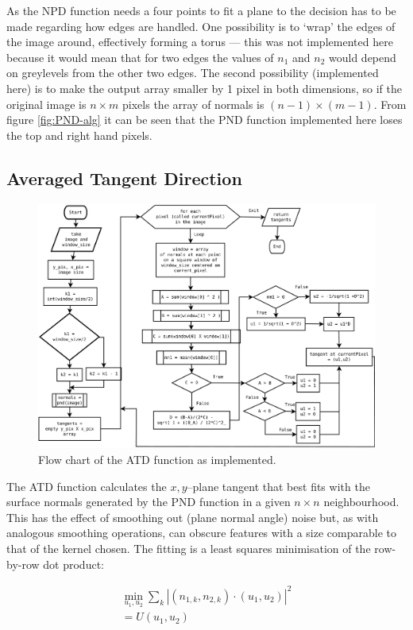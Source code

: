 \documentclass[11pt,a4paper]{article}
\begin{document}
\begin{multicols}{2}
		As the NPD function needs a four points to fit a plane to the decision has to be made regarding how edges are handled. One possibility is to `wrap' the edges of the image around, effectively forming a torus --- this was not implemented here because it would mean that for two edges the values of $n_1$ and $n_2$ would depend on greylevels from the other two edges. The second possibility (implemented here) is to make the output array smaller by 1 pixel in both dimensions, so if the original image is $n \times m$ pixels the array of normals is $(n-1) \times (m-1)$. From figure \ref{fig:PND-alg} it can be seen that the PND function implemented here loses the top and right hand pixels.

	\subsection{Averaged Tangent Direction}
        \begin{figure}
        \centering
        \includegraphics[width = \textwidth]{ATD}
        \caption{Flow chart of the ATD function as implemented.}
        \label{fig:ATD-alg}
      \end{figure}
		The ATD function calculates the $x,y$--plane tangent that best fits with the surface normals generated by the PND function in a given $n \times n$ neighbourhood. This has the effect of smoothing out (plane normal angle) noise but, as with analogous smoothing operations, can obscure features with a size comparable to that of the kernel chosen. The fitting is a least squares minimisation of the row-by-row dot product:

		\begin{equation}
		\begin{split}
			\min_{u_1, u_2} \sum_k |(n_{1,k}, n_{2,k}) \cdot (u_1, u_2)|^2 \\
			= U(u_1, u_2)
		\end{split}
		\end{equation}


\end{multicols}
\end{document}
